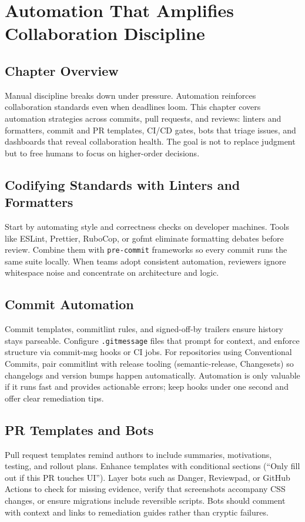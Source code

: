 \chapter{Automation That Amplifies Collaboration Discipline}

\section{Chapter Overview}
Manual discipline breaks down under pressure. Automation reinforces collaboration standards even when deadlines loom. This chapter covers automation strategies across commits, pull requests, and reviews: linters and formatters, commit and PR templates, CI/CD gates, bots that triage issues, and dashboards that reveal collaboration health. The goal is not to replace judgment but to free humans to focus on higher-order decisions.

\section{Codifying Standards with Linters and Formatters}
Start by automating style and correctness checks on developer machines. Tools like ESLint, Prettier, RuboCop, or gofmt eliminate formatting debates before review. Combine them with \texttt{pre-commit} frameworks so every commit runs the same suite locally. When teams adopt consistent automation, reviewers ignore whitespace noise and concentrate on architecture and logic.

\section{Commit Automation}
Commit templates, commitlint rules, and signed-off-by trailers ensure history stays parseable. Configure \texttt{.gitmessage} files that prompt for context, and enforce structure via commit-msg hooks or CI jobs. For repositories using Conventional Commits, pair commitlint with release tooling (semantic-release, Changesets) so changelogs and version bumps happen automatically. Automation is only valuable if it runs fast and provides actionable errors; keep hooks under one second and offer clear remediation tips.

\section{PR Templates and Bots}
Pull request templates remind authors to include summaries, motivations, testing, and rollout plans. Enhance templates with conditional sections (``Only fill out if this PR touches UI''). Layer bots such as Danger, Reviewpad, or GitHub Actions to check for missing evidence, verify that screenshots accompany CSS changes, or ensure migrations include reversible scripts. Bots should comment with context and links to remediation guides rather than cryptic failures.

